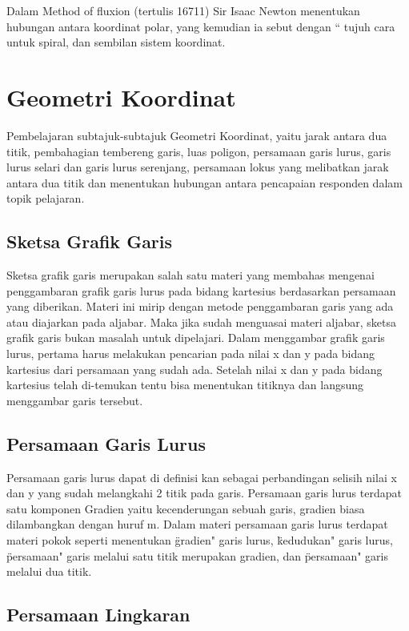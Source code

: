 Dalam Method of fluxion (tertulis 16711) Sir Isaac Newton menentukan hubungan antara koordinat polar, yang kemudian ia sebut dengan “ tujuh cara untuk spiral, dan sembilan sistem koordinat. 

\section{Geometri Koordinat}

 Pembelajaran subtajuk-subtajuk Geometri Koordinat, yaitu jarak antara dua titik, pembahagian tembereng garis, luas poligon, persamaan garis lurus, garis lurus selari dan garis lurus serenjang, persamaan lokus yang melibatkan jarak antara dua titik dan menentukan hubungan antara pencapaian responden dalam topik pelajaran\cite{shong2013analisis}.

 
 \subsection{Sketsa Grafik Garis}
 Sketsa grafik garis merupakan salah satu materi yang membahas mengenai penggambaran grafik garis lurus pada bidang kartesius berdasarkan persamaan yang diberikan. Materi ini mirip dengan metode penggambaran garis yang ada atau diajarkan pada aljabar. Maka jika sudah menguasai materi aljabar, sketsa grafik garis bukan masalah untuk dipelajari. Dalam menggambar grafik garis lurus, pertama harus melakukan pencarian pada nilai x dan y pada bidang kartesius dari persamaan yang sudah ada. Setelah nilai x dan y pada bidang kartesius telah di-temukan tentu bisa menentukan titiknya dan langsung menggambar garis tersebut.
 
 \subsection{Persamaan Garis Lurus}
 Persamaan garis lurus dapat di definisi kan sebagai perbandingan selisih nilai x dan y yang sudah melangkahi 2 titik pada garis. 
 Persamaan garis lurus terdapat satu komponen Gradien yaitu kecenderungan sebuah garis, gradien biasa dilambangkan dengan huruf m.
 Dalam materi persamaan garis lurus terdapat materi pokok seperti menentukan \"gradien" garis lurus, \"kedudukan" garis lurus,
 \"persamaan" garis melalui satu titik merupakan gradien, dan \"persamaan" garis melalui dua titik.
 
 \subsection{Persamaan Lingkaran}

